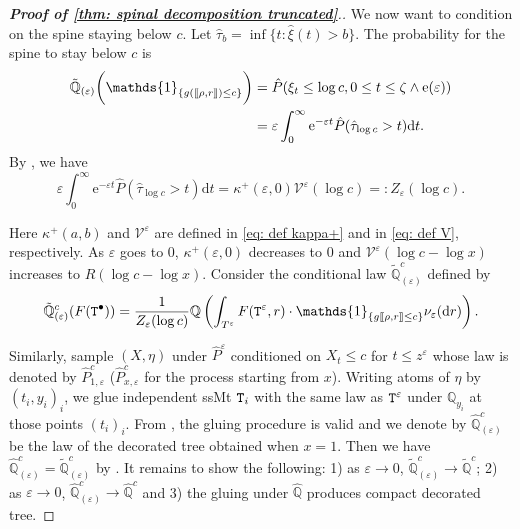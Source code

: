 \documentclass[12pt]{article}
\def\llbracket{[\hspace{-.10em} [ }
\def\rrbracket{ ] \hspace{-.10em}]}
\numberwithin{equation}{section}
\theoremstyle{plain}
\theoremstyle{definition}
\newcommand{\D}{\mathrm{d}}
\begin{document}
\begin{proof}[\textbf{Proof of \cref{thm: spinal decomposition truncated}}.]
We now want to condition on the spine staying below $c$. Let $\hat{\tau}_{b}=\inf\{t:\hat{\xi}(t)>b\}$. The probability for the spine to stay below $c$ is
\begin{align*}
\tilde{\mathbb{Q}}_{(\varepsilon)}\bigg(\mathds{1}_{\{g(\llbracket \rho, r \rrbracket)\leq c\}}\bigg) &= \hat{P}(\xi_t\leq \log c, 0\leq t\leq \zeta \wedge \mathrm{e}(\varepsilon))  \\
&= \varepsilon\int^{\infty}_0 \mathrm{e}^{-\varepsilon t}\hat{P}(\hat{\tau}_{\log c} > t) \D t.
\end{align*}
By \cite[Section 6, Equation (8)]{bertoin1996levy}, we have
\begin{equation*}
    \varepsilon\int_0^{\infty} \mathrm{e}^{-\varepsilon t}\hat P(\hat{\tau}_{\log c}>t)\D t=\kappa^+(\varepsilon,0)\mathscr{V}^{\varepsilon}(\log c)=:Z_{\varepsilon}(\log c).
\end{equation*}

\noindent Here $\kappa^+(a,b)$ and $ \mathscr{V}^{\varepsilon}$ are defined in \eqref{eq: def kappa+} and in \eqref{eq: def V}, respectively. As $\varepsilon$ goes to $0$, $\kappa^+(\varepsilon,0)$ decreases to $0$ and $\mathscr{V}^{\varepsilon}(\log c-\log x)$ increases to $R(\log c-\log x)$. Consider the conditional law $\tilde{\mathbb{Q}}^c_{(\varepsilon)}$ defined by
\begin{equation}
\tilde{\mathbb{Q}}^c_{(\varepsilon)}(F({\tt T}^{\bullet}))
 =  \frac{1}{Z_{\varepsilon}(\log c)}\mathbb Q\left(\int_{T^{\varepsilon}} F({\tt T}^{\varepsilon}, r)\cdot \mathds{1}_{\{g\llbracket \rho, r \rrbracket\leq c\}}\nu_{\varepsilon}(\D r) \right).
\end{equation}

Similarly, sample $(X,\eta)$ under $\hat{P}^{\varepsilon}$ conditioned on $X_t\leq c$ for $t\leq z^{\varepsilon}$ whose law is denoted by $\hat{P}^{c}_{1, \varepsilon}$ ($\hat{P}^{c}_{x, \varepsilon}$ for the process starting from $x$). Writing atoms of $\eta$ by $(t_i,y_i)_i$, we glue independent ssMt ${\tt T}_i$ with the same law as ${\tt T}^{\varepsilon}$ under $\mathbb{Q}_{y_i}$ at those points $(t_i)_i$. From \cite[Proposition 5.6]{BertoinJean2024SMta}, the gluing procedure is valid and we denote by $\hat{\mathbb{Q}}^c_{(\varepsilon)}$ be the law of the decorated tree obtained when $x=1$. Then we have $\hat{\mathbb{Q}}^c_{(\varepsilon)} = \tilde{\mathbb{Q}}^c_{(\varepsilon)}$ by  \cite[Proposition 5.7]{BertoinJean2024SMta}. It remains to show the following: 1) as $\varepsilon\to 0$, $\tilde{\mathbb{Q}}^c_{(\varepsilon)} \to \tilde{\mathbb{Q}}^c$; 2) as $\varepsilon\to 0$, $\hat{\mathbb{Q}}^c_{(\varepsilon)} \to \hat{\mathbb{Q}}^c$ and 3) the gluing under $\hat{\mathbb{Q}}$ produces compact decorated tree.


\end{proof}
\end{document}

